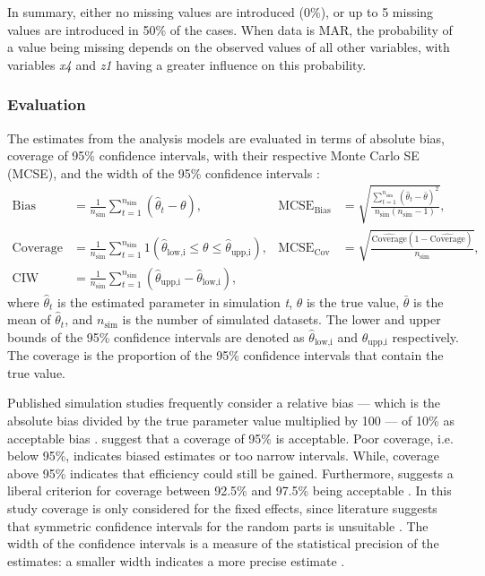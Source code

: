 \documentclass[3p,12pt,a4paper]{elsarticle}
\begin{document}
In summary, either no missing values are introduced (0\%), or up to 5 missing values are introduced in 50\% of the cases. When data is MAR, the probability of a value being missing depends on the observed values of all other variables, with variables \textit{x4} and \textit{z1} having a greater influence on this probability.

\subsubsection{Evaluation}
The estimates from the analysis models are evaluated in terms of absolute bias, coverage of 95\% confidence intervals, with their respective Monte Carlo SE (MCSE), and the width of the 95\% confidence intervals \citep{morris2019,oberman2023}:
\begin{align}
    \text{Bias} &= \frac{1}{n_{\text{sim}}} \sum_{t=1}^{n_{\text{sim}}} (\hat{\theta}_t - \theta), &
    \text{MCSE}_{\text{Bias}} &= \sqrt{\frac{\sum_{t=1}^{n_{\text{sim}}} (\hat{\theta}_t - \bar{\theta})^2}{n_{\text{sim}}(n_{\text{sim}}-1)}}, \label{eq:bias} \\
    \text{Coverage} &= \frac{1}{n_{\text{sim}}} \sum_{t=1}^{n_{\text{sim}}} 1(\hat{\theta}_{\text{low,i}} \leq \theta \leq \hat{\theta}_{\text{upp,i}}), &
    \text{MCSE}_{\text{Cov}} &= \sqrt{\frac{\hat{\text{Coverage}}(1-\hat{\text{Coverage}})}{n_{\text{sim}}}}, \label{eq:coverage} \\
    \text{CIW} &= \frac{1}{n_{\text{sim}}} \sum_{t=1}^{n_{\text{sim}}} (\hat{\theta}_{\text{upp,i}} - \hat{\theta}_{\text{low,i}}), \label{eq:width}
\end{align} where $\hat{\theta}_t$ is the estimated parameter in simulation \textit{t}, $\theta$ is the true value, $\bar{\theta}$ is the mean of $\hat{\theta}_t$, and $n_{\text{sim}}$ is the number of simulated datasets. The lower and upper bounds of the 95\% confidence intervals are denoted as $\hat{\theta}_{\text{low,i}}$ and $\hat{\theta}_{\text{upp,i}}$ respectively. The coverage is the proportion of the 95\% confidence intervals that contain the true value. 

Published simulation studies frequently consider a relative bias --- which is the absolute bias divided by the true parameter value multiplied by 100 --- of 10\% as acceptable bias \citep{enders2018,enders2018a,enders2020,finch1997}. \citet{morris2019,enders2018,oberman2023,buurenFlexibleImputationMissing2018} suggest that a coverage of 95\% is acceptable. Poor coverage, i.e. below 95\%, indicates biased estimates or too narrow intervals. While, coverage above 95\% indicates that efficiency could still be gained. Furthermore, \citet{bradley1978} suggests a liberal criterion for coverage between 92.5\% and 97.5\% being acceptable \citep{enders2018,enders2018a,enders2020}. In this study coverage is only considered for the fixed effects, since literature suggests that symmetric confidence intervals for the random parts is unsuitable \citep{enders2018,enders2018a,enders2020,maas2005}.
The width of the confidence intervals is a measure of the statistical precision of the estimates: a smaller width indicates a more precise estimate \citep{oberman2023,buurenFlexibleImputationMissing2018}.
\end{document}
